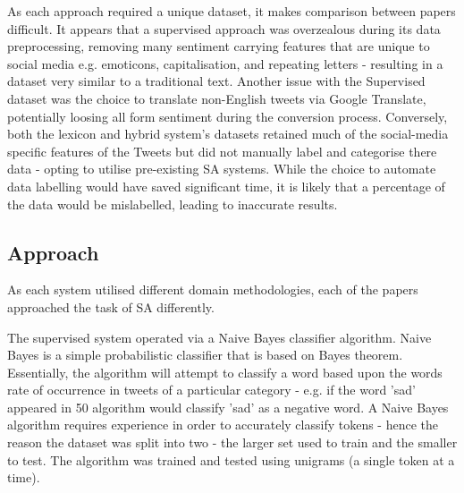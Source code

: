 \documentclass[twocolumn]{article}
\begin{document}
As each approach required a unique dataset, it makes comparison between
papers difficult.
It appears that a supervised approach was overzealous during its data
preprocessing, removing many sentiment carrying features that are unique to
social media e.g. emoticons, capitalisation, and repeating letters - resulting
in a dataset very similar to a traditional text.
Another issue with the Supervised dataset was the choice to translate
non-English tweets via Google Translate, potentially loosing all form
sentiment during the conversion process.
Conversely, both the lexicon and hybrid system's datasets retained much of the
social-media specific features of the Tweets but did not manually label and
categorise there data - opting to utilise pre-existing SA systems.
While the choice to automate data labelling would have saved significant time,
it is likely that a percentage of the data would be mislabelled,
leading to inaccurate results.

\subsection{Approach}
As each system utilised different domain methodologies, each  of the
papers approached the task of SA differently.

The supervised system operated via a Naive Bayes classifier algorithm.
Naive Bayes is a simple probabilistic classifier that is based on Bayes
theorem.
Essentially, the algorithm will attempt to classify a word based upon the
words rate of occurrence in tweets of a particular category - e.g. if the word
'sad' appeared in 50%
algorithm would classify 'sad' as a negative word.
A Naive Bayes algorithm requires experience in order to accurately classify
tokens - hence the reason the dataset was split into two - the larger set used
to train and the smaller to test.
The algorithm was trained and tested using unigrams (a single token at a
time).
\end{document}
